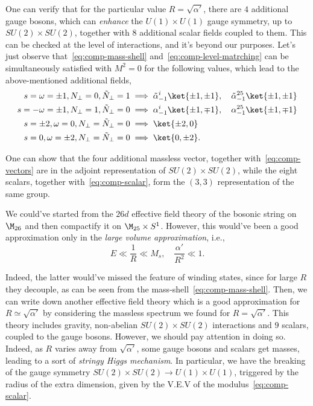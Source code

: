 One can verify that for the particular value $R = \sqrt{\alpha'}$, there are $4$ additional gauge bosons, which can \emph{enhance} the $U(1) \times U(1)$ gauge symmetry, up to $SU(2) \times SU(2)$, together with $8$ additional scalar fields coupled to them. This can be checked at the level of interactions, and it's beyond our purposes. Let's just observe that~\eqref{eq:comp-mass-shell} and~\eqref{eq:comp-level-matrching} can be simultaneously satisfied with $M^2=0$ for the following values, which lead to the above-mentioned additional fields,
\begin{subequations}
\begin{align}
    s=\omega = \pm 1, N_\perp = 0, \tilde{N}_\perp = 1 &\implies \tilde{\alpha}^i_{-1} \ket{\pm 1, \pm 1}, \quad \tilde{\alpha}^{25}_{-1}\ket{\pm 1, \pm 1} \\
    s= -\omega = \pm 1, N_\perp = 1, \tilde{N}_\perp = 0 &\implies \alpha^i_{-1} \ket{\pm 1, \mp 1}, \quad \alpha^{25}_{-1}\ket{\pm 1, \mp 1} \\
    s = \pm 2, \omega = 0, N_\perp = \tilde{N}_\perp = 0 &\implies \ket{\pm 2, 0} \\
    s = 0, \omega = \pm 2, N_\perp = \tilde{N}_\perp = 0 &\implies \ket{0, \pm 2}. 
\end{align}
\end{subequations}

One can show that the four additional massless vector, together with~\eqref{eq:comp-vectors} are in the adjoint representation of $SU(2) \times SU(2)$, while the eight scalars, together with~\eqref{eq:comp-scalar}, form the $(3,3)$ representation of the same group.

We could've started from the $26d$ effective field theory of the bosonic string on $\M_{26}$ and then compactify it on $\M_{25} \times S^1$. However, this would've been a good approximation only in the \emph{large volume approximation}, i.e.,
\begin{equation}\label{eq:large-volume-approx}
    E \ll \frac{1}{R} \ll M_s, \quad \frac{\alpha'}{R^2} \ll 1.
\end{equation}

Indeed, the latter would've missed the feature of winding states, since for large $R$ they decouple, as can be seen from the mass-shell~\eqref{eq:comp-mass-shell}. Then, we can write down another effective field theory which is a good approximation for $R \simeq \sqrt{\alpha'}$ by considering the massless spectrum we found for $R = \sqrt{\alpha'}$. This theory includes gravity, non-abelian $SU(2) \times SU(2)$ interactions and $9$ scalars, coupled to the gauge bosons. However, we should pay attention in doing so. Indeed, as $R$ varies away from $\sqrt{\alpha'}$, some gauge bosons and scalars get masses, leading to a sort of \emph{stringy Higgs mechanism}. In particular, we have the breaking of the gauge symmetry $SU(2) \times SU(2) \to U(1) \times U(1)$, triggered by the radius of the extra dimension, given by the V.E.V of the modulus~\eqref{eq:comp-scalar}.

